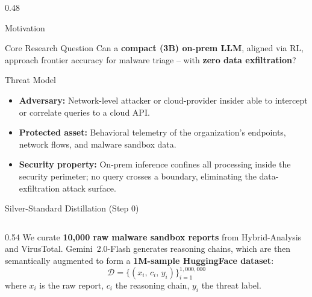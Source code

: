 \documentclass[final]{beamer}
\newcommand{\vsep}{\vspace{1.2em}}
\begin{document}
\begin{frame}[t]{}
\begin{columns}[T]
\begin{column}{0.48\linewidth}
\begin{block}{Motivation}
\vsep

\begin{alertblock}{Core Research Question}
  \centering\large
  Can a \textbf{compact (3B) on-prem LLM}, aligned via RL, approach
  frontier accuracy for malware triage -- with \textbf{zero data exfiltration}?
\end{alertblock}

\end{block}

\vsep

\begin{block}{Threat Model}
\begin{itemize}
  \item \textbf{Adversary:} Network-level attacker or cloud-provider
    insider able to intercept or correlate queries to a cloud API.
  \item \textbf{Protected asset:} Behavioral telemetry of the
    organization's endpoints, network flows, and malware sandbox data.
  \item \textbf{Security property:} On-prem inference confines all
    processing inside the security perimeter; no query crosses a
    boundary, eliminating the data-exfiltration attack surface.
\end{itemize}
\end{block}

\vsep

\begin{block}{Silver-Standard Distillation (Step 0)}

\begin{columns}[T]
  \begin{column}{0.54\linewidth}
    We curate \textbf{10,000 raw malware sandbox reports} from
    Hybrid-Analysis and VirusTotal.
    Gemini~2.0-Flash generates reasoning chains, which are then
    semantically augmented to form a \textbf{1M-sample HuggingFace dataset}:
    \[
      \mathcal{D} = \{(x_i,\, c_i,\, y_i)\}_{i=1}^{1,000,000}
    \]
    where $x_i$ is the raw report, $c_i$ the reasoning chain,
    $y_i$ the threat label.


\end{column}
\end{columns}
\end{block}
\end{column}
\end{columns}
\end{frame}
\end{document}
